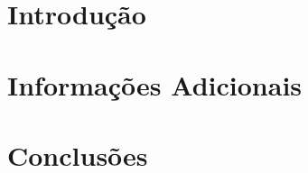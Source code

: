 \documentclass[a4paper,12pt,oneside,openany]{book}
\begin{document}
\frontmatter
\thispagestyle{empty}



\pagebreak            



     \tableofcontents
\listoffigures
\listoftables

\mainmatter
\cleardoublepage
\chapter{Introdução}
\label{cap1}


\chapter{Informações Adicionais}
\label{cap2}


\chapter{Conclusões}
\label{cap3}


\normalsize
\cleardoublepage
{}



   \appendix
\end{document}

